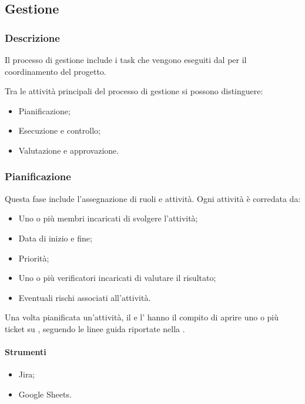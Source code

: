 \subsection{Gestione}

\subsubsection{Descrizione}
\par Il processo di gestione include i task che vengono eseguiti dal \Responsabile{} per il coordinamento del progetto.
\par Tra le attività principali del processo di gestione si possono distinguere:
\begin{itemize}
  \item Pianificazione;
  \item Esecuzione e controllo;
  \item Valutazione e approvazione.
\end{itemize}

\subsubsection{Pianificazione}
\par Questa fase include l'assegnazione di ruoli e attività. Ogni attività è corredata da:
\begin{itemize}
  \item Uno o più membri incaricati di svolgere l'attività;
  \item Data di inizio e fine;
  \item Priorità;
  \item Uno o più verificatori incaricati di valutare il risultato;
  \item Eventuali rischi associati all'attività.
\end{itemize}

\vspace{0.5\baselineskip}
\par Una volta pianificata un'attività, il \Responsabile{} e l'\Amministratore{} hanno il compito di aprire uno o più ticket su , seguendo le linee guida riportate nella .

\paragraph*{Strumenti}
\IntroStrumenti
\begin{itemize}
  \item Jira;
  \item Google Sheets.
\end{itemize}

